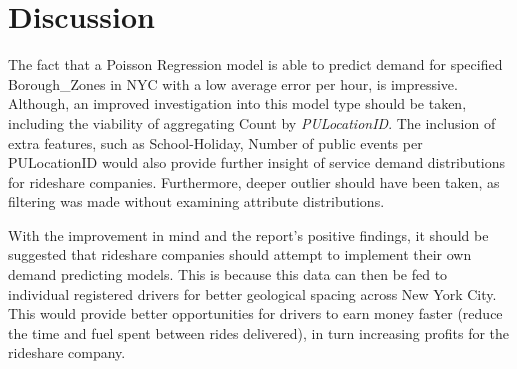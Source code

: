 \documentclass[11pt]{article}
\begin{document}
\section{Discussion}
The fact that a Poisson Regression model is able to predict demand for specified Borough\_Zones in NYC with a low average error per hour, is impressive. Although, an improved investigation into this model type should be taken, including the viability of aggregating Count by \textit{PULocationID}. The inclusion of extra features, such as School-Holiday, Number of public events per PULocationID would also provide further insight of service demand  distributions for rideshare companies. Furthermore, deeper outlier should have been taken, as filtering was made without examining attribute distributions.

With the improvement in mind and the report's positive findings, it should be suggested that rideshare companies should attempt to implement their own demand predicting models. This is because this data can then be fed to individual registered drivers for better geological spacing across New York City. This would provide better opportunities for drivers to earn money faster (reduce the time and fuel spent between rides delivered), in turn increasing profits for the rideshare company. 

\printbibliography
\end{document}
